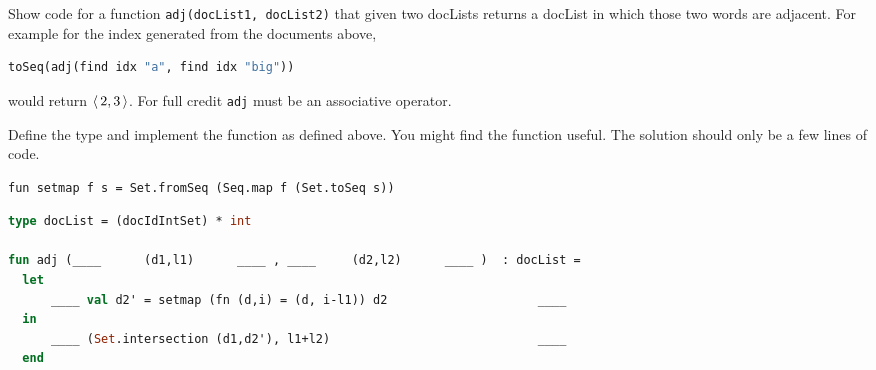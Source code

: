 \begin{problem}[8.]

Show code for a function \texttt{adj(docList1, docList2)} that given
two docLists returns a docList in which those two words
are adjacent.  For example for the index generated from the documents
above, 
\begin{lstlisting}[language=Caml,numbers=none]
toSeq(adj(find idx "a", find idx "big")) 
\end{lstlisting}
would return
$\left\langle\, {2, 3} \,\right\rangle$.  For full credit \texttt{adj} must be an associative operator.

\ask
Define the  type and implement the function  as defined above.
You might find the function  useful. The solution should
only be a few lines of code.
\begin{lstlisting}[numbers=none]
fun setmap f s = Set.fromSeq (Seq.map f (Set.toSeq s)) 
\end{lstlisting}


\solfin
\begin{lstlisting}[language=Caml,numbers=none]
type docList = (docIdIntSet) * int

fun adj (____      (d1,l1)      ____ , ____     (d2,l2)      ____ )  : docList = 
  let 
      ____ val d2' = setmap (fn (d,i) = (d, i-l1)) d2                     ____
  in  
      ____ (Set.intersection (d1,d2'), l1+l2)                             ____
  end
\end{lstlisting}


   
\end{problem}

